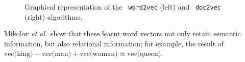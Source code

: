 \documentclass[11pt]{article}
\def\etal{\emph{et al}.\ }
\begin{document}
\begin{figure}
  \centering{}
  \centering{}
  \caption{Graphical representation of the ~\texttt{word2vec} (left)
           and ~\texttt{doc2vec} (right) algorithms.}
  \label{fig:cbow}
\end{figure}
Mikolov \etal show that these learnt word vectors not only retain semantic
information, but also relational information; for example, the result of
$\text{vec(king)} - \text{vec(man)} + \text{vec(woman)} \approx
\text{vec(queen)}$.
\end{document}
